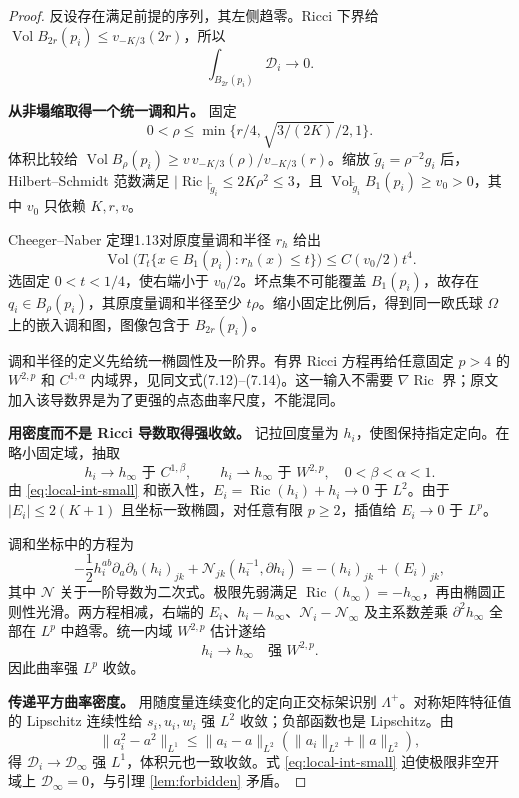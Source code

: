 \documentclass[UTF8,fontset=fandol,zihao=-4]{ctexart}
\theoremstyle{cn}
\DeclareMathOperator{\Ric}{Ric}
\DeclareMathOperator{\Vol}{Vol}
\newcommand{\Dcal}{\mathcal D}
\numberwithin{equation}{section}
\begin{document}
\begin{proof}
反设存在满足前提的序列，其左侧趋零。Ricci 下界给 $\Vol B_{2r}(p_i)\le v_{-K/3}(2r)$，所以
\begin{equation}\label{eq:local-int-small}
\int_{B_{2r}(p_i)}\Dcal_i\longrightarrow0.
\end{equation}

\textbf{从非塌缩取得一个统一调和片。}
固定
\[
0<\rho\le\min\{r/4,\sqrt{3/(2K)}/2,1\}.
\]
体积比较给 $\Vol B_\rho(p_i)\ge v\,v_{-K/3}(\rho)/v_{-K/3}(r)$。缩放 $\tilde g_i=\rho^{-2}g_i$ 后，Hilbert--Schmidt 范数满足 $|\Ric|_{\tilde g_i}\le2K\rho^2\le3$，且 $\Vol_{\tilde g_i}B_1(p_i)\ge v_0>0$，其中 $v_0$ 只依赖 $K,r,v$。

Cheeger--Naber 定理1.13\cite{cn}对原度量调和半径 $r_h$ 给出
\begin{equation}\label{eq:CN}
\Vol\bigl(T_t\{x\in B_1(p_i):r_h(x)\le t\}\bigr)\le C(v_0/2)t^4.
\end{equation}
选固定 $0<t<1/4$，使右端小于 $v_0/2$。坏点集不可能覆盖 $B_1(p_i)$，故存在 $q_i\in B_\rho(p_i)$，其原度量调和半径至少 $t\rho$。缩小固定比例后，得到同一欧氏球 $\Omega$ 上的嵌入调和图，图像包含于 $B_{2r}(p_i)$。

调和半径的定义先给统一椭圆性及一阶界。有界 Ricci 方程再给任意固定 $p>4$ 的 $W^{2,p}$ 和 $C^{1,\alpha}$ 内域界，见同文式(7.12)--(7.14)。这一输入不需要 $\nabla\Ric$ 界；原文加入该导数界是为了更强的点态曲率尺度，不能混同。

\textbf{用密度而不是 Ricci 导数取得强收敛。}
记拉回度量为 $h_i$，使图保持指定定向。在略小固定域，抽取
\[
h_i\to h_\infty\text{ 于 }C^{1,\beta},\qquad
h_i\rightharpoonup h_\infty\text{ 于 }W^{2,p},\quad0<\beta<\alpha<1.
\]
由 \eqref{eq:local-int-small} 和嵌入性，$E_i=\Ric(h_i)+h_i\to0$ 于 $L^2$。由于 $|E_i|\le2(K+1)$ 且坐标一致椭圆，对任意有限 $p\ge2$，插值给 $E_i\to0$ 于 $L^p$。

调和坐标中的方程为
\begin{equation}\label{eq:ricci-pde}
-\frac12h_i^{ab}\partial_a\partial_b(h_i)_{jk}
+\mathcal N_{jk}(h_i^{-1},\partial h_i)
=-(h_i)_{jk}+(E_i)_{jk},
\end{equation}
其中 $\mathcal N$ 关于一阶导数为二次式。极限先弱满足 $\Ric(h_\infty)=-h_\infty$，再由椭圆正则性光滑。两方程相减，右端的 $E_i$、$h_i-h_\infty$、$\mathcal N_i-\mathcal N_\infty$ 及主系数差乘 $\partial^2h_\infty$ 全部在 $L^p$ 中趋零。统一内域 $W^{2,p}$ 估计遂给
\[
h_i\longrightarrow h_\infty\quad\text{强 }W^{2,p}.
\]
因此曲率强 $L^p$ 收敛。

\textbf{传递平方曲率密度。}
用随度量连续变化的定向正交标架识别 $\Lambda^+$。对称矩阵特征值的 Lipschitz 连续性给 $s_i,u_i,w_i$ 强 $L^2$ 收敛；负部函数也是 Lipschitz。由
\[
\|a_i^2-a^2\|_{L^1}\le\|a_i-a\|_{L^2}(\|a_i\|_{L^2}+\|a\|_{L^2}),
\]
得 $\Dcal_i\to\Dcal_\infty$ 强 $L^1$，体积元也一致收敛。式 \eqref{eq:local-int-small} 迫使极限非空开域上 $\Dcal_\infty=0$，与引理 \ref{lem:forbidden} 矛盾。
\end{proof}
\end{document}
